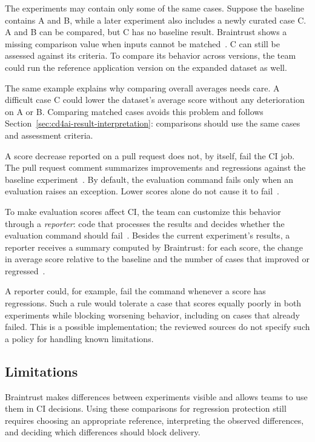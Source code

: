 The experiments may contain only some of the same cases. Suppose the baseline
contains A and B, while a later experiment also includes a newly curated case C.
A and B can be compared, but C has no baseline result. Braintrust shows a
missing comparison value when inputs cannot be matched~\parencite{Braintrust:Comparison}.
C can still be assessed against its criteria. To compare its behavior across
versions, the team could run the reference application version on the expanded
dataset as well.

The same example explains why comparing overall averages needs care. A
difficult case C could lower the dataset's average score without any
deterioration on A or B.
Comparing matched cases avoids this problem and follows
Section~\ref{sec:cd4ai-result-interpretation}: comparisons should use the same
cases and assessment criteria.

A score decrease reported on a pull request does not, by itself, fail the CI
job. The pull request comment summarizes improvements and regressions against the
baseline experiment~\parencite{Braintrust:Comparison}. By default, the
evaluation command fails only when an evaluation raises an exception. Lower
scores alone do not cause it to fail~\parencite{Braintrust:CI}.

To make evaluation scores affect CI, the team can customize this behavior
through a \emph{reporter}: code that processes the results and decides whether
the evaluation command should fail~\parencite{Braintrust:CI}. Besides the
current experiment's results, a reporter receives a summary computed by
Braintrust: for each score, the change in average score relative to the
baseline and the number of cases that improved or
regressed~\parencite{Braintrust:SDKPython,Braintrust:SDKTypeScript}.

A reporter could, for example, fail the command whenever a score has
regressions. Such a rule would tolerate a case that scores equally poorly in
both experiments while blocking worsening behavior, including on cases that
already failed. This is a possible implementation; the reviewed sources do not
specify such a policy for handling known limitations.

\subsection{Limitations}

Braintrust makes differences between experiments visible and allows teams to
use them in CI decisions. Using these comparisons for regression protection
still requires choosing an appropriate reference, interpreting the observed
differences, and deciding which differences should block delivery.

